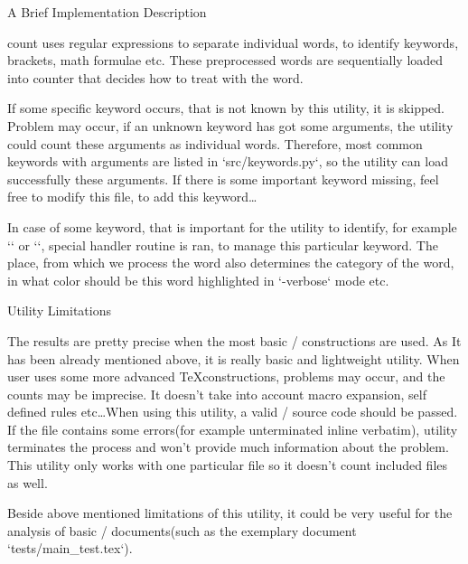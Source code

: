 \sec A Brief Implementation Description

\OpTeX count uses regular expressions to separate individual words, to identify keywords, brackets, math formulae etc. These preprocessed words are sequentially loaded into counter that decides how to treat with the word.

If some specific keyword occurs, that is not known by this utility, it is skipped. Problem may occur, if an unknown keyword has got some arguments, the utility could count these arguments as individual words. Therefore, most common keywords with arguments are listed in `src/keywords.py`, so the utility can load successfully these arguments. If there is some important keyword missing, feel free to modify this file, to add this keyword\dots

In case of some keyword, that is important for the utility to identify, for example {\Blue `\sec`} or {\Blue `\fnote`}, special handler routine is ran, to manage this particular keyword. The place, from which we process the word also determines the category of the word, in what color should be this word highlighted in {\Blue `-verbose`} mode etc.


\sec Utility Limitations

The results are pretty precise when the most basic \OpTeX/ constructions are used. As It has been already mentioned above, it is really basic and lightweight utility. When user uses some more advanced \TeX constructions, problems may occur, and the counts may be imprecise. It doesn't take into account macro expansion, self defined rules etc\dots When using this utility, a valid \OpTeX/ source code should be passed. If the file contains some errors(for example unterminated inline verbatim), utility terminates the process and won't provide much information about the problem. This utility only works with one particular file so it doesn't count included files as well.

Beside above mentioned limitations of this utility, it could be very useful for the analysis of basic \OpTeX/ documents(such as the exemplary document {\Blue `tests/main_test.tex`}).

\bye
